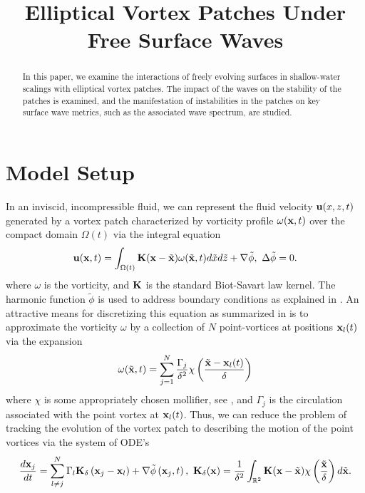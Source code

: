 \documentclass[a4paper,11pt]{article}
\title{Elliptical Vortex Patches Under Free Surface Waves}
\date{}
\begin{document}
\maketitle
\begin{abstract}
In this paper, we examine the interactions of freely evolving surfaces in shallow-water scalings with elliptical vortex patches.   The impact of the waves on the stability of the patches is examined, and the manifestation of instabilities in the patches on key surface wave metrics, such as the associated wave spectrum, are studied. 
\end{abstract}
\section*{Model Setup}
In an inviscid, incompressible fluid, we can represent the fluid velocity ${\bf u}(x,z,t)$ generated by a vortex patch characterized by vorticity profile $\omega({\bf x},t)$ over the compact domain $\Omega(t)$ via the integral equation
\[
{\bf u}({\bf x},t) = \int_{\Omega(t)} {\bf K}({\bf x}-\tilde{{\bf x}})\omega(\tilde{{\bf x}},t)d\tilde{x}d\tilde{z} + \nabla \tilde{\phi}, ~ \Delta \tilde{\phi} = 0.
\]
where $\omega$ is the vorticity, and ${\bf K}$ is the standard Biot-Savart law kernel.  The harmonic function $\tilde{\phi}$ is used to address boundary conditions as explained in \cite{saffman}.  An attractive means for discretizing this equation as summarized in \cite{cottet} is to approximate the vorticity $\omega$ by a collection of $N$ point-vortices at positions ${\bf x}_{l}(t)$ via the expansion
\begin{equation}
\omega(\tilde{{\bf x}},t) = \sum_{j=1}^{N} \frac{\Gamma_{j}}{\delta^{2}}\chi\left(\frac{\tilde{{\bf x}}-{\bf x}_{l}(t)}{\delta}\right)
\label{discvort} 
\end{equation}
where $\chi$ is some appropriately chosen mollifier, see \cite{beale}, and $\Gamma_{j}$ is the circulation associated with the point vortex at ${\bf x}_{l}(t)$.  Thus, we can reduce the problem of tracking the evolution of the vortex patch to describing the motion of the point vortices via the system of ODE's
\[
\frac{d{\bf x}_{j}}{dt}  =  \sum_{l\neq j}^{N} \Gamma_{l} {\bf K}_{\delta}\left({\bf x}_{j}-{\bf x}_{l}\right) + \nabla \tilde{\phi}\left({\bf x}_{j},t\right), ~ {\bf K}_{\delta}({\bf x}) = \frac{1}{\delta^{2}}\int_{\mathbb{R}^{2}}{\bf K}({\bf x} - \tilde{\bf x})\chi \left(\frac{\tilde{{\bf x}}}{\delta} \right) d \tilde{{\bf x}}.
\]
\end{document}
